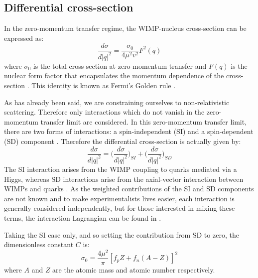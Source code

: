\subsection{Differential cross-section}
In the zero-momentum transfer regime, the WIMP-nucleus cross-section can be expressed as:
\begin{equation}
    \frac{d\sigma}{d|q|^2} = \frac{\sigma_0}{4\mu^2 v^2} F^2(q)
\end{equation}
where $\sigma_0$ is the total cross-section at zero-momentum transfer and $F(q)$ is the nuclear form factor that encapsulates the momentum dependence of the cross-section \cite{shaunalsum_thesis_ref}.
This identity is known as Fermi's Golden rule \cite{shaunalsum_thesis_ref}.
\par
As has already been said, we are constraining ourselves to non-relativistic scattering.
Therefore only interactions which do not vanish in the zero-momentum transfer limit are considered.
In this zero-momentum transfer limit, there are two forms of interactions: a spin-independent (SI) and a spin-dependent (SD) component  \cite{wimp_lagrangian_ref}.
Therefore the differential cross-section is actually given by:
\begin{equation}
    \frac{d\sigma}{d|q|^2} = \bigg(\frac{d\sigma}{d|q|^2}\bigg)_{SI} + \bigg(\frac{d\sigma}{d|q|^2}\bigg)_{SD}
\end{equation}
The SI interaction arises from the WIMP coupling to quarks mediated via a Higgs, whereas SD interactions arise from the axial-vector interaction between WIMPs and quarks \cite{supersymmetric_dark_matter_ref}.
As the weighted contributions of the SI and SD components are not known and to make experimentalists lives easier, each interaction is generally considered independently, but for those interested in mixing these terms, the interaction Lagrangian can be found in \cite{wimp_lagrangian_ref}.
\par
Taking the SI case only, and so setting the contribution from SD to zero, the dimensionless constant $C$ is:
\begin{equation}
    \sigma_0 = \frac{4\mu^2}{\pi} [f_pZ + f_n (A-Z)]^2
\end{equation}
where $A$ and $Z$ are the atomic mass and atomic number respectively.
